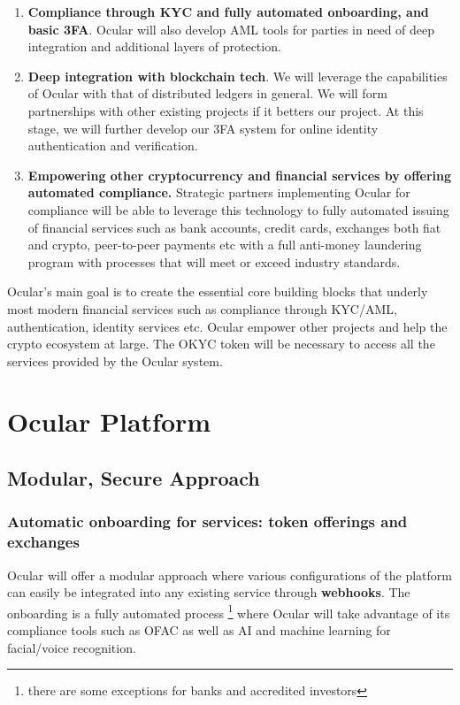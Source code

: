 \documentclass[a4paper]{article}
\begin{document}
\begin{enumerate}
\item \textbf{Compliance through KYC and fully automated onboarding, and basic 3FA}. Ocular will also develop AML tools for parties in need of deep integration and additional layers of protection. 

\item \textbf{Deep integration with blockchain tech}. We will leverage the capabilities of Ocular with that of distributed ledgers in general. We will form partnerships with other existing projects if it betters our project. At this stage, we will further develop our 3FA system for online identity authentication and verification. 

\item \textbf{Empowering other cryptocurrency and financial services by offering automated compliance.} Strategic partners implementing Ocular for compliance will be able to leverage this technology to fully automated issuing of financial services such as bank accounts, credit cards, exchanges both fiat and crypto, peer-to-peer payments etc with a full anti-money laundering program with processes that will meet or exceed industry standards. 


\end{enumerate}

Ocular's main goal is to create the essential core building blocks that underly most modern financial services such as compliance through KYC/AML, authentication, identity services etc. Ocular empower other projects and help the crypto ecosystem at large. The OKYC token will be necessary to access all the services provided by the Ocular system.

\clearpage
\section{Ocular Platform}
\subsection{Modular, Secure Approach}
\subsubsection*{Automatic onboarding for services: token offerings and exchanges}
Ocular will offer a modular approach where various configurations of the platform can easily be integrated into any existing service through \textbf{webhooks}. The onboarding is a fully automated process \footnote{there are some exceptions for banks and accredited investors} where Ocular will take advantage of its compliance tools such as OFAC as well as AI and machine learning for facial/voice recognition. 
\end{document}
